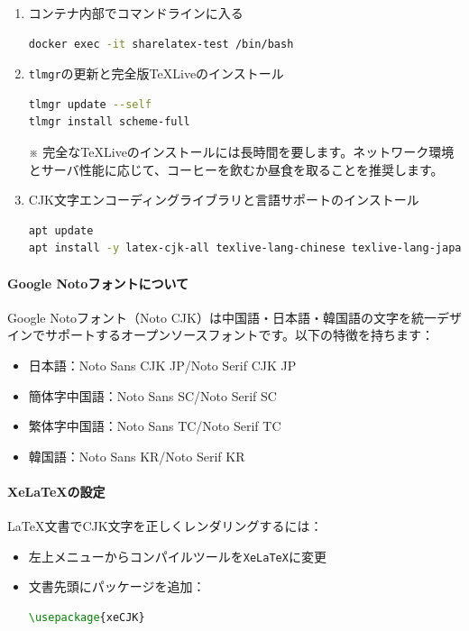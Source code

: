 \begin{enumerate}
\item コンテナ内部でコマンドラインに入る
\begin{lstlisting}[language=bash]
docker exec -it sharelatex-test /bin/bash
\end{lstlisting}

\item \texttt{tlmgr}の更新と完全版TeXLiveのインストール
\begin{lstlisting}[language=bash]
tlmgr update --self
tlmgr install scheme-full
\end{lstlisting}
※ 完全なTeXLiveのインストールには長時間を要します。ネットワーク環境とサーバ性能に応じて、コーヒーを飲むか昼食を取ることを推奨します。

\item CJK文字エンコーディングライブラリと言語サポートのインストール
\begin{lstlisting}[language=bash]
apt update
apt install -y latex-cjk-all texlive-lang-chinese texlive-lang-japanese texlive-lang-korean texlive-lang-english fonts-noto-cjk
\end{lstlisting}
\end{enumerate}

\paragraph{Google Notoフォントについて}
Google Notoフォント（Noto CJK）は中国語・日本語・韓国語の文字を統一デザインでサポートするオープンソースフォントです。以下の特徴を持ちます：
\begin{itemize}
\item 日本語：Noto Sans CJK JP/Noto Serif CJK JP
\item 簡体字中国語：Noto Sans SC/Noto Serif SC
\item 繁体字中国語：Noto Sans TC/Noto Serif TC
\item 韓国語：Noto Sans KR/Noto Serif KR
\end{itemize}

\paragraph{XeLaTeXの設定}
LaTeX文書でCJK文字を正しくレンダリングするには：
\begin{itemize}
\item 左上メニューからコンパイルツールを\texttt{XeLaTeX}に変更
\item 文書先頭にパッケージを追加：
\begin{lstlisting}[language=TeX]
\usepackage{xeCJK}
\end{lstlisting}
\end{itemize}

